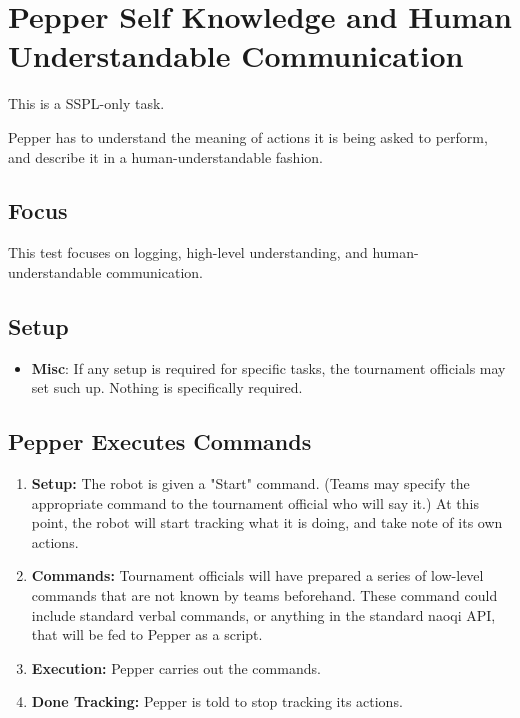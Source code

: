 \section{Pepper Self Knowledge and Human Understandable Communication}

This is a SSPL-only task.

Pepper has to understand the meaning of actions it is being asked to perform, and describe it in a human-understandable fashion.

\subsection{Focus}

This test focuses on logging, high-level understanding, and human-understandable communication.

\subsection{Setup}
\begin{itemize}
	\item \textbf{Misc}: If any setup is required for specific tasks, the tournament officials may set such up.  Nothing is specifically required.
\end{itemize}

\subsection{Pepper Executes Commands}

\begin{enumerate}

	\item \textbf{Setup:} The robot is given a "Start" command.  (Teams may specify the appropriate command to the tournament official who will say it.)  At this point, the robot will start tracking what it is doing, and take note of its own actions.

	\item \textbf{Commands:} Tournament officials will have prepared a series of low-level commands that are not known by teams beforehand.  These command could include standard verbal commands, or anything in the standard naoqi API, that will be fed to Pepper as a script.
	\item \textbf{Execution:} Pepper carries out the commands.
	\item \textbf{Done Tracking:} Pepper is told to stop tracking its actions.

\end{enumerate}

